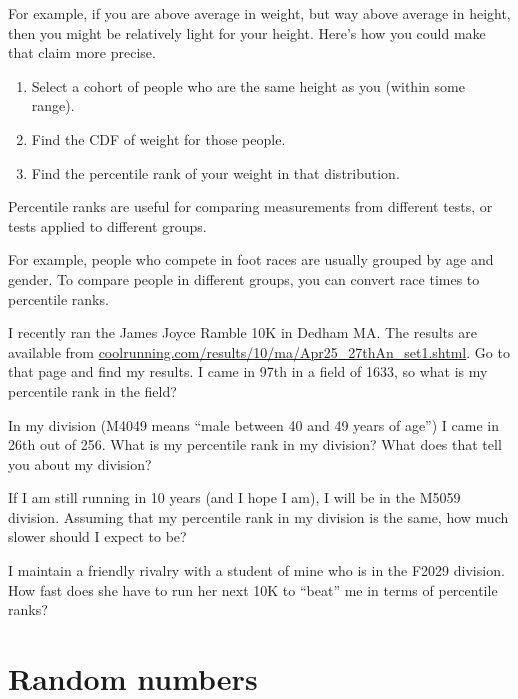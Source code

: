 \documentclass[12pt]{book}
\begin{document}
For example, if you are above average in weight, but way above average
in height, then you might be relatively light for your height.  Here's
how you could make that claim more precise.

\begin{enumerate}

\item Select a cohort of people who are the same height as you (within
some range).

\item Find the CDF of weight for those people.

\item Find the percentile rank of your weight in that distribution.

\end{enumerate}

Percentile ranks are useful for comparing measurements from
different tests, or tests applied to different groups.

For example, people who compete in foot races are usually grouped by
age and gender.  To compare people in different groups, you can convert
race times to percentile ranks.

\begin{ex}

I recently ran the James Joyce Ramble 10K
in Dedham MA.  The results are available from
\url{coolrunning.com/results/10/ma/Apr25_27thAn_set1.shtml}.
Go to that page and find my results.  I came in 97th in a field
of 1633, so what is my percentile rank in the field?

In my division (M4049 means ``male between 40 and 49 years of age'')
I came in 26th out of 256.  What is my percentile rank in my division?
What does that tell you about my division?

If I am still running in 10 years (and I hope I am), I will be in
the M5059 division.  Assuming that my percentile rank in my division
is the same, how much slower should I expect to be?

I maintain a friendly rivalry with a student of mine who is in the
F2029 division.  How fast does she have to run her next 10K to
``beat'' me in terms of percentile ranks?

\end{ex}

\section{Random numbers}
\label{random}
\end{document}
